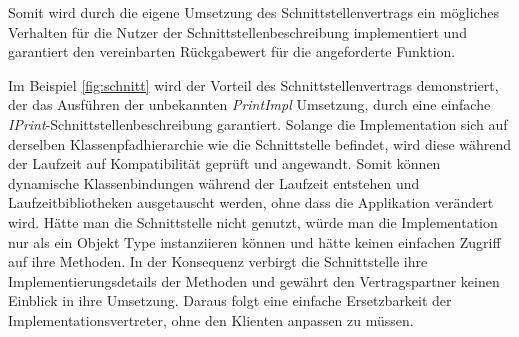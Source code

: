   Somit wird durch die eigene Umsetzung des Schnittstellenvertrags ein mögliches Verhalten für die Nutzer der Schnittstellenbeschreibung implementiert und garantiert den vereinbarten Rückgabewert für die angeforderte Funktion. \cite{bloch2017effective}\bigbreak 
  
  Im Beispiel \ref{fig:schnitt} wird der Vorteil des Schnittstellenvertrags demonstriert, der das Ausführen der unbekannten \textit{PrintImpl} Umsetzung, durch eine einfache \textit{IPrint}-Schnittstellenbeschreibung garantiert. Solange die Implementation sich auf derselben Klassenpfadhierarchie wie die Schnittstelle befindet, wird diese während der Laufzeit auf Kompatibilität geprüft und angewandt. Somit können dynamische Klassenbindungen während der Laufzeit entstehen und Laufzeitbibliotheken ausgetauscht werden, ohne dass die Applikation verändert wird. Hätte man die Schnittstelle nicht genutzt, würde man die Implementation nur als ein Objekt Type instanziieren können und hätte keinen einfachen Zugriff auf ihre Methoden. In der Konsequenz verbirgt die Schnittstelle ihre Implementierungsdetails der Methoden und gewährt den Vertragspartner keinen Einblick in ihre Umsetzung. Daraus folgt eine einfache Ersetzbarkeit der Implementationsvertreter, ohne den Klienten anpassen zu müssen. \cite{Forman04javareflection}

